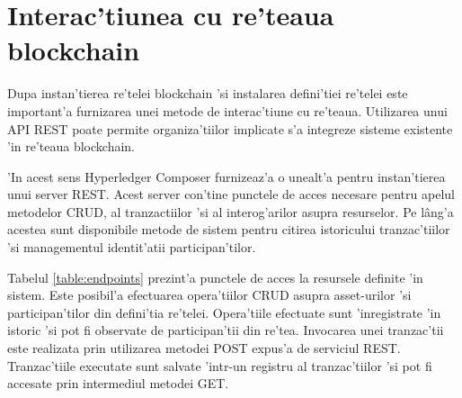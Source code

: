 \documentclass[12pt,a4paper,twoside]{report}
\begin{document}
\section{Interac'tiunea cu re'teaua blockchain}
    Dupa instan'tierea re'telei blockchain 'si instalarea defini'tiei re'telei este important'a furnizarea unei metode de interac'tiune cu re'teaua. Utilizarea unui API REST poate permite organiza'tiilor implicate s'a integreze sisteme existente 'in re'teaua blockchain. 
    
    'In acest sens Hyperledger Composer furnizeaz'a o unealt'a pentru instan'tierea unui server REST. Acest server con'tine punctele de acces necesare pentru apelul metodelor CRUD, al tranzactiilor 'si al interog'arilor asupra resurselor. Pe l\^ang'a acestea sunt disponibile metode de sistem pentru citirea istoricului tranzac'tiilor 'si managementul identit'atii participan'tilor. 
    
    Tabelul \ref{table:endpoints} prezint'a punctele de acces la resursele definite 'in sistem. Este posibil'a efectuarea opera'tiilor CRUD asupra asset-urilor 'si participan'tilor din defini'tia re'telei. Opera'tiile efectuate sunt 'inregistrate 'in istoric 'si pot fi observate de participan'tii din re'tea. Invocarea unei tranzac'tii este realizata prin utilizarea metodei POST expus'a de serviciul REST. Tranzac'tiile executate sunt salvate 'intr-un registru al tranzac'tiilor 'si pot fi accesate prin intermediul metodei GET.
    
\end{document}
